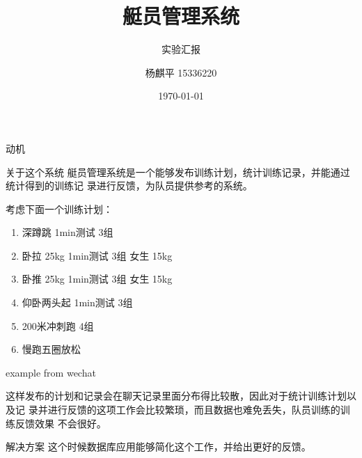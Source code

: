 \documentclass{beamer}
\title{艇员管理系统}
\subtitle{实验汇报}
\author{杨麒平 15336220}
\institute{rowing crew}
\date{\today}
\begin{document}

\begin{frame}
  \titlepage
\end{frame}

\begin{frame}{动机}
   {
    \begin{block}{关于这个系统}
    艇员管理系统是一个能够发布训练计划，统计训练记录，并能通过统计得到的训练记
    录进行反馈，为队员提供参考的系统。
  \end{block}


    考虑下面一个训练计划：

  \begin{enumerate}
  \item {深蹲跳 1min测试 3组}
  \item {卧拉 25kg 1min测试 3组 女生 15kg}
  \item {卧推 25kg 1min测试 3组 女生 15kg}
  \item {仰卧两头起 1min测试 3组}
  \item {200米冲刺跑 4组}
  \item {慢跑五圈放松}
  \end{enumerate}}

   {
    example from wechat

    这样发布的计划和记录会在聊天记录里面分布得比较散，因此对于统计训练计划以及记
    录并进行反馈的这项工作会比较繁琐，而且数据也难免丢失，队员训练的训练反馈效果
    不会很好。
  }

   {
    \begin{block}{解决方案}
    这个时候数据库应用能够简化这个工作，并给出更好的反馈。
    \end{block}
  }



  



  


  
\end{frame}
\end{document}

